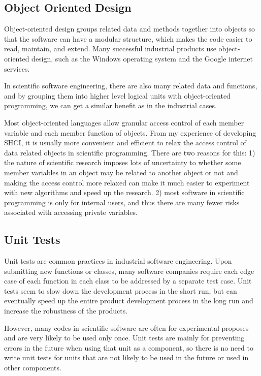 \subsection{Object Oriented Design}
Object-oriented design groups related data and methods together into objects so that the software can have a modular structure, which makes the code easier to read, maintain, and extend.
Many successful industrial products use object-oriented design, such as the Windows operating system and the Google internet services.

In scientific software engineering, there are also many related data and functions, and by grouping them into higher level logical units with object-oriented programming, we can get a similar benefit as in the industrial cases.

Most object-oriented languages allow granular access control of each member variable and each member function of objects.
From my experience of developing SHCI, it is usually more convenient and efficient to relax the access control of data related objects in scientific programming.
There are two reasons for this:
1) the nature of scientific research imposes lots of uncertainty to whether some member variables in an object may be related to another object or not and making the access control more relaxed can make it much easier to experiment with new algorithms and speed up the research.
2) most software in scientific programming is only for internal users, and thus there are many fewer risks associated with accessing private variables.

\subsection{Unit Tests}
Unit tests are common practices in industrial software engineering.
Upon submitting new functions or classes, many software companies require each edge case of each function in each class to be addressed by a separate test case.
Unit tests seem to slow down the development process in the short run, but can eventually speed up the entire product development process in the long run and increase the robustness of the products.

However, many codes in scientific software are often for experimental proposes and are very likely to be used only once.
Unit tests are mainly for preventing errors in the future when using that unit as a component, so there is no need to write unit tests for units that are not likely to be used in the future or used in other components.

